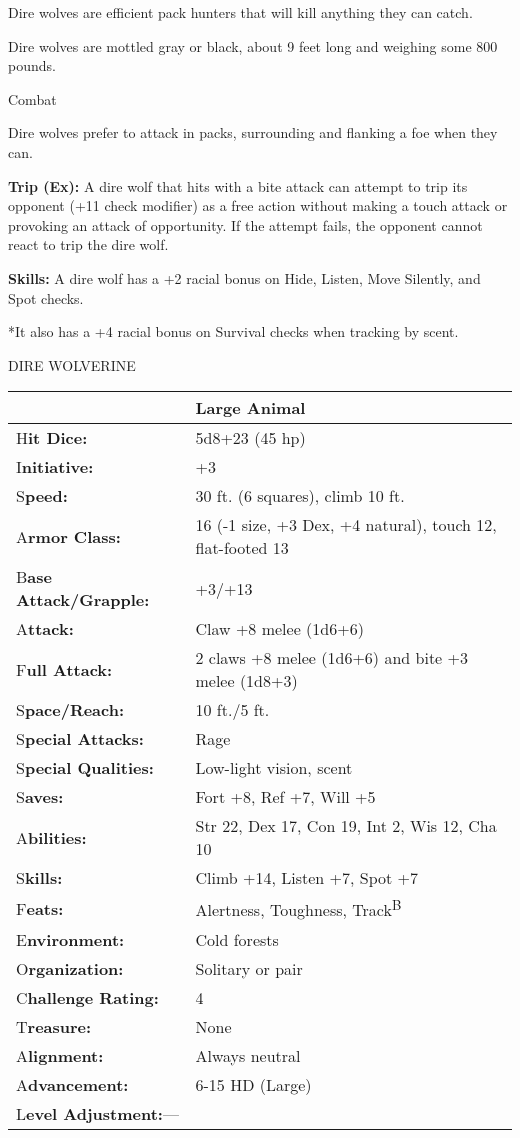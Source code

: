 \documentclass{article}
\begin{document}
Dire wolves are efficient pack hunters that will kill anything they can catch.

Dire wolves are mottled gray or black, about 9 feet long and weighing some 800 
pounds.

Combat

Dire wolves prefer to attack in packs, surrounding and flanking a foe when they 
can.

\textbf{Trip (Ex):} A dire wolf that hits with a bite attack can attempt to trip 
its opponent (+11 check modifier) as a free action without making a touch attack 
or provoking an attack of opportunity. If the attempt fails, the opponent cannot 
react to trip the dire wolf.

\textbf{Skills:} A dire wolf has a +2 racial bonus on Hide, Listen, Move Silently, 
and Spot checks. 

*It also has a +4 racial bonus on Survival checks when tracking by scent.

\vspace{12pt}
DIRE WOLVERINE

\begin{tabular}{|>{\raggedright}p{91pt}|>{\raggedright}p{226pt}|}
\hline
  & Large Animal\tabularnewline
\hline
H\textbf{it Dice:} & 5d8+23 (45 hp)\tabularnewline
\hline
I\textbf{nitiative:} & +3\tabularnewline
\hline
S\textbf{peed:} & 30 ft. (6 squares), climb 10 ft.\tabularnewline
\hline
A\textbf{rmor Class:} & 16 (-1 size, +3 Dex, +4 natural), touch 12, flat-footed 
13\tabularnewline
\hline
B\textbf{ase Attack/Grapple:} & +3/+13\tabularnewline
\hline
A\textbf{ttack:} & Claw +8 melee (1d6+6)\tabularnewline
\hline
F\textbf{ull Attack:} & 2 claws +8 melee (1d6+6) and bite +3 melee (1d8+3)\tabularnewline
\hline
S\textbf{pace/Reach:} & 10 ft./5 ft.\tabularnewline
\hline
S\textbf{pecial Attacks:} & Rage\tabularnewline
\hline
S\textbf{pecial Qualities:} & Low-light vision, scent\tabularnewline
\hline
S\textbf{aves:} & Fort +8, Ref +7, Will +5\tabularnewline
\hline
A\textbf{bilities:} & Str 22, Dex 17, Con 19, Int 2, Wis 12, Cha 10\tabularnewline
\hline
S\textbf{kills:} & Climb +14, Listen +7, Spot +7\tabularnewline
\hline
F\textbf{eats:} & Alertness, Toughness, Track\textsuperscript{B}\tabularnewline
\hline
E\textbf{nvironment:} & Cold forests\tabularnewline
\hline
O\textbf{rganization:} & Solitary or pair\tabularnewline
\hline
C\textbf{hallenge Rating:} & 4\tabularnewline
\hline
T\textbf{reasure:} & None\tabularnewline
\hline
A\textbf{lignment:} & Always neutral\tabularnewline
\hline
A\textbf{dvancement:} & 6-15 HD (Large)\tabularnewline
\hline
L\textbf{evel Adjustment:}--- & \tabularnewline
\hline
\end{tabular}
\end{document}

